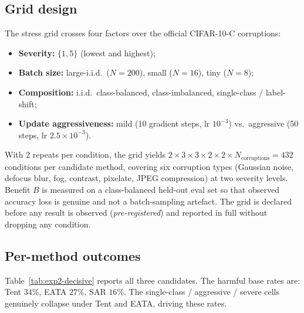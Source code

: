 \subsection{Grid design}\label{sec:exp2-grid-design}

The stress grid crosses four factors over the official CIFAR-10-C corruptions:
\begin{itemize}
\item \textbf{Severity:} $\{1, 5\}$ (lowest and highest);
\item \textbf{Batch size:} large-i.i.d.\ ($N{=}200$), small ($N{=}16$), tiny ($N{=}8$);
\item \textbf{Composition:} i.i.d.\ class-balanced, class-imbalanced, single-class /
  label-shift;
\item \textbf{Update aggressiveness:} mild (10 gradient steps, lr $10^{-3}$) vs.\
  aggressive (50 steps, lr $2.5{\times}10^{-3}$).
\end{itemize}
With 2 repeats per condition, the grid yields $2 \times 3 \times 3 \times 2 \times
2 \times N_{\text{corruptions}} = 432$ conditions per candidate method, covering
six corruption types (Gaussian noise, defocus blur, fog, contrast, pixelate, JPEG
compression) at two severity levels.  Benefit $B$ is measured on a class-balanced
held-out eval set so that observed accuracy loss is genuine and not a batch-sampling
artefact.  The grid is declared before any result is observed (\emph{pre-registered})
and reported in full without dropping any condition.

\subsection{Per-method outcomes}\label{sec:exp2-grid-results}

Table~\ref{tab:exp2-decisive} reports all three candidates.  The harmful base
rates are: Tent $34\%$, EATA $27\%$, SAR $16\%$.  The single-class / aggressive /
severe cells genuinely collapse under Tent and EATA, driving these rates.

